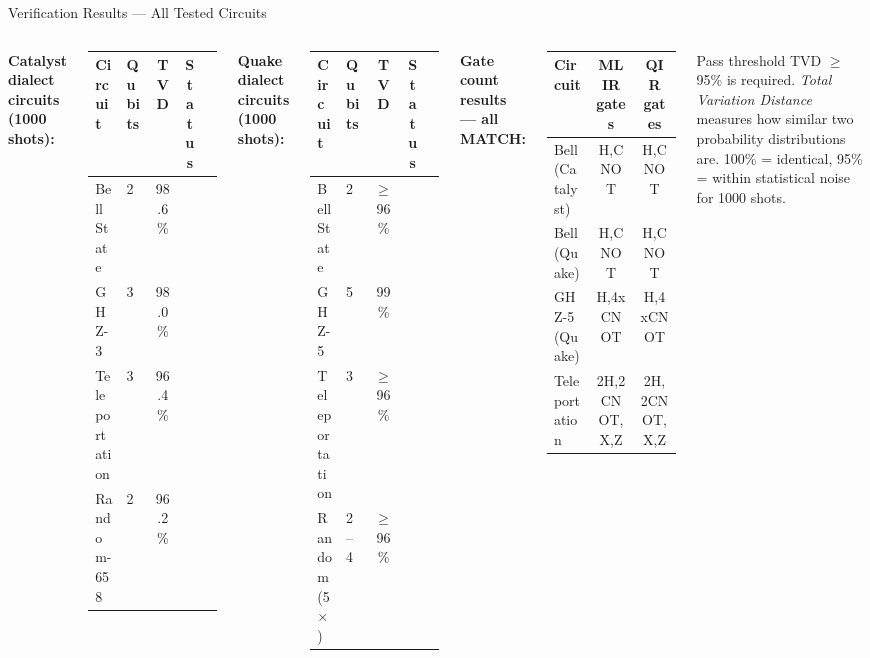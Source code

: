 \documentclass[aspectratio=169,10pt]{beamer}
\newcommand{\hlg}[1]{\textcolor{qirgreen}{\textbf{#1}}}
\begin{document}
\begin{frame}{Verification Results --- All Tested Circuits}
  \begin{columns}[T]
      \textbf{Catalyst dialect circuits (1000 shots):}
      \vspace{4pt}
      \begin{tabular}{@{}llccc@{}}
        \toprule
        Circuit & Qubits & TVD & Status \\
        \midrule
        Bell State & 2 & 98.6\% & \hlg{\checkmark} \\
        GHZ-3 & 3 & 98.0\% & \hlg{\checkmark} \\
        Teleportation & 3 & 96.4\% & \hlg{\checkmark} \\
        Random-658 & 2 & 96.2\% & \hlg{\checkmark} \\
        \bottomrule
      \end{tabular}
      \vspace{8pt}
      \textbf{Quake dialect circuits (1000 shots):}
      \vspace{4pt}
      \begin{tabular}{@{}llccc@{}}
        \toprule
        Circuit & Qubits & TVD & Status \\
        \midrule
        Bell State & 2 & $\ge$96\% & \hlg{\checkmark} \\
        GHZ-5 & 5 & 99\% & \hlg{\checkmark} \\
        Teleportation & 3 & $\ge$96\% & \hlg{\checkmark} \\
        Random (5$\times$) & 2--4 & $\ge$96\% & \hlg{\checkmark} \\
        \bottomrule
      \end{tabular}
      \textbf{Gate count results --- all MATCH:}
      \vspace{4pt}
      \begin{tabular}{@{}lcc@{}}
        \toprule
        Circuit & MLIR gates & QIR gates \\
        \midrule
        Bell (Catalyst) & H,CNOT & H,CNOT \\
        Bell (Quake) & H,CNOT & H,CNOT \\
        GHZ-5 (Quake) & H,4xCNOT & H,4xCNOT \\
        Teleportation & 2H,2CNOT,X,Z & 2H,2CNOT,X,Z \\
        \bottomrule
      \end{tabular}
      \vspace{8pt}
      \begin{exampleblock}{Pass threshold}
        TVD $\ge$ 95\% is required.
        \textit{Total Variation Distance} measures
        how similar two probability distributions are.
        100\% = identical, 95\% = within statistical
        noise for 1000 shots.
      \end{exampleblock}
  \end{columns}
\end{frame}
\end{document}
